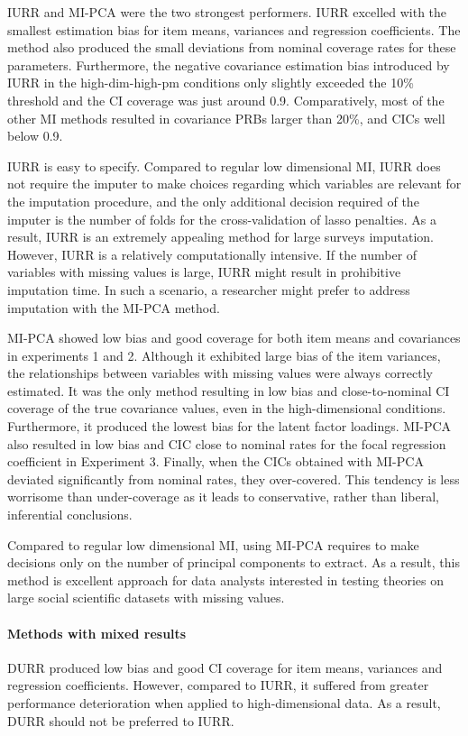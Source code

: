 	IURR and MI-PCA were the two strongest performers.
	IURR excelled with the smallest estimation bias for item means, variances and regression coefficients.
	The method also produced the small deviations from nominal coverage rates for these parameters.
	Furthermore, the negative covariance estimation bias introduced by IURR in the high-dim-high-pm conditions
	only slightly exceeded the 10\% threshold and the CI coverage was just around 0.9.
	Comparatively, most of the other MI methods resulted in covariance PRBs larger than 20\%, and CICs 
	well below 0.9.

	IURR is easy to specify.
	Compared to regular low dimensional MI, IURR does not require the imputer to make choices regarding which variables
	are relevant for the imputation procedure, and the only additional decision required of the imputer is the 
	number of folds for the cross-validation of lasso penalties.
	As a result, IURR is an extremely appealing method for large surveys imputation.
	However, IURR is a relatively computationally intensive.
	If the number of variables with missing values is large, IURR might result in prohibitive imputation time.
	In such a scenario, a researcher might prefer to address imputation with the MI-PCA method.

	MI-PCA showed low bias and good coverage for both item means and covariances in experiments 1 and 2.
	Although it exhibited large bias of the item variances, the relationships between variables with missing values 
	were always correctly estimated.
	It was the only method resulting in low bias and close-to-nominal CI coverage of the true covariance values,
	even in the high-dimensional conditions.
	Furthermore, it produced the lowest bias for the latent factor loadings.	
	MI-PCA also resulted in low bias and CIC close to nominal rates for the focal regression coefficient
	in Experiment 3.
	Finally, when the CICs obtained with MI-PCA deviated significantly from nominal rates, they over-covered.
	This tendency is less worrisome than under-coverage as it leads to conservative, rather than liberal, 
	inferential conclusions.
	
	Compared to regular low dimensional MI, using MI-PCA requires to make decisions only on the number of 
	principal components to extract.
	As a result, this method is excellent approach for data analysts interested in testing theories on 
	large social scientific datasets with missing values.

\paragraph{Methods with mixed results}
	DURR produced low bias and good CI coverage for item means, variances and regression coefficients.
	However, compared to IURR, it suffered from greater performance deterioration when applied to 
	high-dimensional data. 
	As a result, DURR should not be preferred to IURR.

